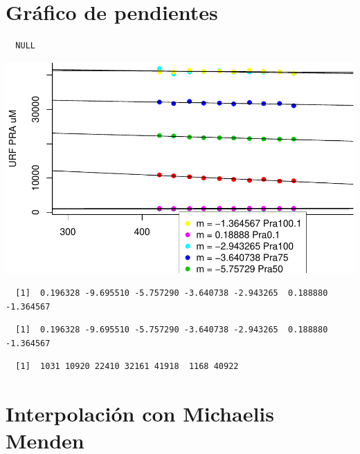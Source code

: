 \documentclass[12pt,twoside]{reedthesis}
\begin{document}
{  \section{Gráfico de pendientes}\label{grafico-de-pendientes}
  
  \begin{verbatim}
  NULL
  \end{verbatim}
  
  \begin{center}\includegraphics{tesis_files/figure-latex/slopes-1} \end{center}
  
  \begin{verbatim}
  [1]  0.196328 -9.695510 -5.757290 -3.640738 -2.943265  0.188880 -1.364567
  \end{verbatim}
  
  \begin{verbatim}
  [1]  0.196328 -9.695510 -5.757290 -3.640738 -2.943265  0.188880 -1.364567
  \end{verbatim}
  
  \begin{verbatim}
  [1]  1031 10920 22410 32161 41918  1168 40922
  \end{verbatim}
  
  \section{Interpolación con Michaelis
  Menden}\label{interpolacion-con-michaelis-menden}
  
  \begin{Shaded}
  \begin{Highlighting}[]
  \end{Highlighting}
  \end{Shaded}
  
}
\end{document}
